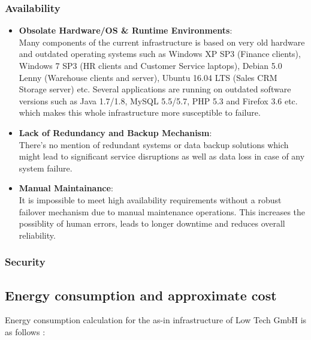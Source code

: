 \documentclass{llncs}
\begin{document}
\subsubsection*{Availability}
\begin{itemize}
  \item \textbf{Obsolate Hardware/OS \& Runtime Environments}: 
  \\
  Many components of the current infrastructure is based on very old hardware and outdated operating systems such as 
  Windows XP SP3 (Finance clients), Windows 7 SP3 (HR clients and Customer Service laptops), Debian 5.0 Lenny (Warehouse clients and server),
  Ubuntu 16.04 LTS (Sales CRM Storage server) etc. Several applications are running on outdated software versions such as Java 1.7/1.8, 
  MySQL 5.5/5.7, PHP 5.3 and Firefox 3.6 etc. which makes this whole infrastructure more susceptible to failure.
  \\
  \item \textbf{Lack of Redundancy and Backup Mechanism}:
  \\ 
  There's no mention of redundant systems or data backup solutions which might lead to significant service disruptions as well as data loss in case of any system failure.
  \\
  \item \textbf{Manual Maintainance}: 
  \\It is impossible to meet high availability requirements without a robust failover mechanism due to manual maintenance operations. 
  This increases the possiblity of human errors, leads to longer downtime and reduces overall reliability.
  \\
\end{itemize}
\subsubsection*{Security}

\subsection{Energy consumption and approximate cost}

Energy consumption calculation for the as-in infrastructure of Low Tech GmbH is as follows : 
\end{document}
